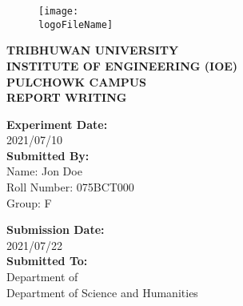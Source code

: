 \documentclass[12pt]{article}
\newcommand\experimentDate{2021/07/10}
\newcommand\submissionDate{2021/07/22}
\newcommand\campusName{PULCHOWK CAMPUS}
\newcommand\assignmentTitle{REPORT WRITING}
\newcommand\studentName{Jon Doe}
\newcommand\rollNumber{075BCT000}
\newcommand\group{F}
\newcommand\departmentName{Department of Science and Humanities}
\newcommand\logoFileName{TU-logo}
\newcommand\logoScaleFactor{0.5}
\begin{document}
\thispagestyle{empty}

\begin{center}
  \begin{figure}[t]
    \texttt{[image: \\logoFileName]}
    \centering
  \end{figure}
  \textbf{
    \Large{
      TRIBHUWAN UNIVERSITY \\
      INSTITUTE OF ENGINEERING (IOE) \\
      \vspace{5mm}
      \campusName \\
    }
    \vspace{8mm}
    \large {
      \assignmentTitle
    }
  }
\end{center}

\vspace{5mm}
\begin{center}
\end{center}

\vfill

\begin{multicols}{2}

  \begin{flushleft}
    \textbf{Experiment Date:} \\
    \experimentDate \\
    \vspace{3mm}
    \textbf{Submitted By:} \\
    Name: \studentName \\
    Roll Number: \rollNumber \\
    Group: \group \\
  \end{flushleft}

  \columnbreak

  \begin{flushright}
    \textbf{Submission Date:} \\
    \submissionDate \\
    \vspace{3mm}
    \textbf{Submitted To:} \\
    Department of \\
    \departmentName
  \end{flushright}

\end{multicols}
\end{document}
